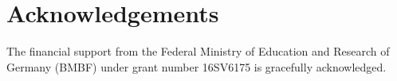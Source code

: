 \documentclass{svproc}
\begin{document}
%


\section*{Acknowledgements}

The financial support from the Federal Ministry of Education and Research
of Germany (BMBF) under grant number 16SV6175 is gracefully acknowledged.




\end{document}
